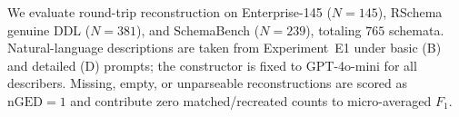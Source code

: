 We evaluate round-trip reconstruction on Enterprise-145 ($N{=}145$), RSchema genuine DDL ($N{=}381$), and SchemaBench ($N{=}239$), totaling $765$ schemata.
Natural-language descriptions are taken from Experiment~E1 under basic (B) and detailed (D) prompts; the constructor is fixed to GPT-4o-mini for all describers.
Missing, empty, or unparseable reconstructions are scored as $\mathrm{nGED}{=}1$ and contribute zero matched/recreated counts to micro-averaged $F_1$.
